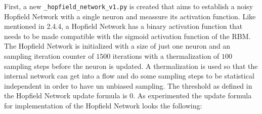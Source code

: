 First, a new \texttt{\_hopfield\_network\_v1.py} is created that aims to establish a noisy Hopfield Network with a single neuron 
and meassure its activation function.
Like mentioned in 2.4.4, a Hopfield Network has a binary activation function that needs to be made compatible with the sigmoid activation function of the \ac{RBM}.
The Hopfield Network is initialized with a size of just one neuron and an sampling iteration counter of \(1500\) iterations with a thermalization of \(100\) sampling steps before 
the neuron is updated.
A thermalization is used so that the internal network can get into a flow and do some sampling steps to be statistical independent in order to have un unbiased sampling.
The threshold as defined in the Hopfield Network update formula is \(0\). 
As experimented the update formula for implementation of the Hopfield Network looks the following:

